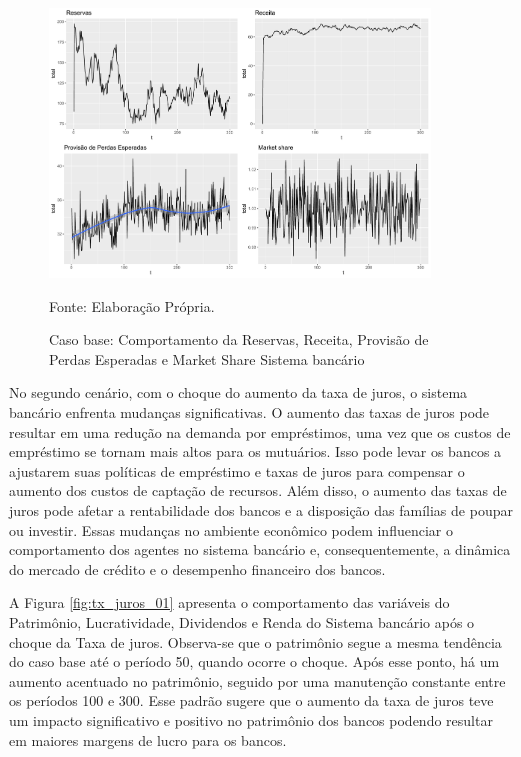 \documentclass[hidelinks, article,12pt,oneside,a4paper,english,brazil,sumario=tradicional]{abntex2}
\begin{document}
\begin{figure} [H]
\caption{Caso base: Comportamento da Reservas, Receita, Provisão de Perdas Esperadas e Market Share Sistema bancário} \label{fig:base_02}
\centering %

\includegraphics[width=0.9\textwidth]{figs/base_02.pdf}

Fonte: Elaboração Própria.
\label{fig:dec_var_fbcf}
\end{figure}


No segundo cenário, com o choque do aumento da taxa de juros, o sistema bancário enfrenta mudanças significativas. O aumento das taxas de juros pode resultar em uma redução na demanda por empréstimos, uma vez que os custos de empréstimo se tornam mais altos para os mutuários. Isso pode levar os bancos a ajustarem suas políticas de empréstimo e taxas de juros para compensar o aumento dos custos de captação de recursos. Além disso, o aumento das taxas de juros pode afetar a rentabilidade dos bancos e a disposição das famílias de poupar ou investir. Essas mudanças no ambiente econômico podem influenciar o comportamento dos agentes no sistema bancário e, consequentemente, a dinâmica do mercado de crédito e o desempenho financeiro dos bancos.

A Figura \ref{fig:tx_juros_01} apresenta o comportamento das variáveis do Patrimônio, Lucratividade, Dividendos e Renda do Sistema bancário após o choque da Taxa de juros. Observa-se que o patrimônio segue a mesma tendência do caso base até o período 50, quando ocorre o choque. Após esse ponto, há um aumento acentuado no patrimônio, seguido por uma manutenção constante entre os períodos 100 e 300. Esse padrão sugere que o aumento da taxa de juros teve um impacto significativo e positivo no patrimônio dos bancos podendo resultar em maiores margens de lucro para os bancos.
\end{document}
